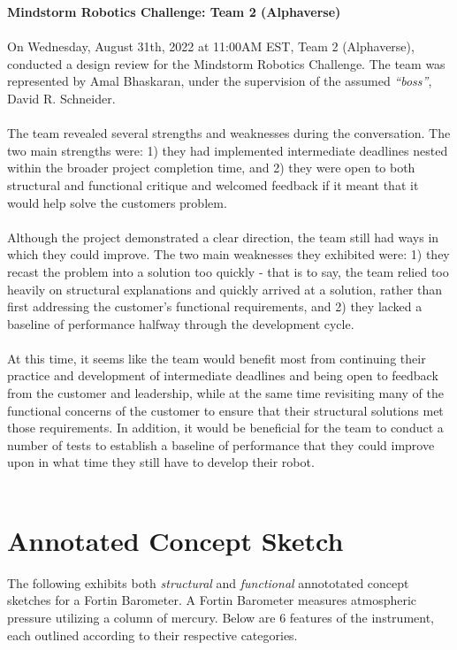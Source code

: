 \documentclass{article}
\begin{document}
\textbf{Mindstorm Robotics Challenge: Team 2 (Alphaverse)}\\~\\

\noindent
On Wednesday, August 31th, 2022 at 11:00AM EST, Team 2 (Alphaverse), conducted a design review for the Mindstorm Robotics Challenge. The team was represented by Amal Bhaskaran, under the supervision of the assumed \textit{“boss”}, David R. Schneider.\\~\\
The team revealed several strengths and weaknesses during the conversation. The two main strengths were: 1) they had implemented intermediate deadlines nested within the broader project completion time, and 2) they were open to both structural and functional critique and welcomed feedback if it meant that it would help solve the customers problem.\\~\\
Although the project demonstrated a clear direction, the team still had ways in which they could improve. The two main weaknesses they exhibited were: 1) they recast the problem into a solution too quickly - that is to say, the team relied too heavily on structural explanations and quickly arrived at a solution, rather than first addressing the customer's functional requirements, and 2) they lacked a baseline of performance halfway through the development cycle.\\~\\
At this time, it seems like the team would benefit most from continuing their practice and development of intermediate deadlines and being open to feedback from the customer and leadership, while at the same time revisiting many of the functional concerns of the customer to ensure that their structural solutions met those requirements. In addition, it would be beneficial for the team to conduct a number of tests to establish a baseline of performance that they could improve upon in what time they still have to develop their robot.\\~\\

\newpage
\section*{Annotated Concept Sketch}

The following exhibits both \textit{structural} and \textit{functional} annototated concept sketches for a Fortin Barometer.
A Fortin Barometer measures atmospheric pressure utilizing a column of mercury. 
Below are 6 features of the instrument, each outlined according to their respective categories.
\end{document}
